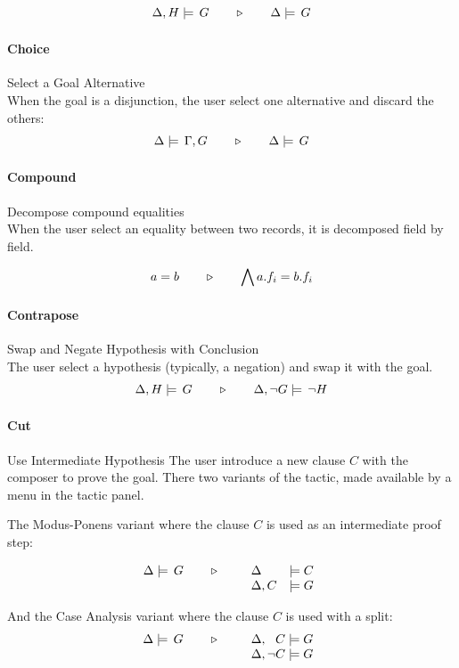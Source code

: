 $$ \Delta,H\models\,G\quad\quad\triangleright\quad\quad\Delta\models\,G $$

\paragraph{Choice} Select a Goal Alternative\\
When the goal is a disjunction, the user select one alternative and discard the others:
$$ \Delta\models\,\Gamma,G\quad\quad\triangleright\quad\quad\Delta\models\,G $$

\paragraph{Compound} Decompose compound equalities\\
When the user select an equality between two records, it is decomposed field by field.

$$ a = b \quad\quad\triangleright\quad\quad \bigwedge a.f_i = b.f_i $$

\paragraph{Contrapose} Swap and Negate Hypothesis with Conclusion\\
The user select a hypothesis (typically, a negation) and swap it with the goal.
$$ \Delta,H\models\,G\quad\quad\triangleright\quad\quad\Delta,\neg G\models\,\neg H $$

\paragraph{Cut} Use Intermediate Hypothesis
The user introduce a new clause $C$ with the composer to prove the goal. There two variants of the tactic, made available by a menu in the tactic panel.

The \textsf{Modus-Ponens} variant where the clause $C$ is used as an intermediate proof step:

$$\TACTIC{\Delta\models\,G}{%
\begin{array}[t]{ll}
\Delta &\models C \\
\Delta,C &\models G
\end{array}} $$

And the \textsf{Case Analysis} variant where the clause $C$ is used with a split:
$$\TACTIC{\Delta\models\,G}{%
\begin{array}[t]{ll}
\Delta,\phantom{\neg}C \models G \\
\Delta,\neg C \models G
\end{array}} $$

